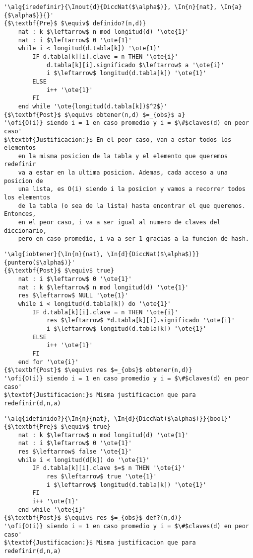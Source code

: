 \begin{lstlisting}[mathescape]
'\alg{iredefinir}{\Inout{d}{DiccNat($\alpha$)}, \In{n}{nat}, \In{a}{$\alpha$}}{}'
{$\textbf{Pre}$ $\equiv$ definido?(n,d)}
	nat : k $\leftarrow$ n mod longitud(d) '\ote{1}'
	nat : i $\leftarrow$ 0 '\ote{1}'
	while i < longitud(d.tabla[k]) '\ote{1}'
		IF d.tabla[k][i].clave = n THEN '\ote{i}'
			d.tabla[k][i].significado $\leftarrow$ a '\ote{i}'
			i $\leftarrow$ longitud(d.tabla[k]) '\ote{1}'
		ELSE
			i++ '\ote{1}'
		FI
	end while '\ote{longitud(d.tabla[k])$^2$}'
{$\textbf{Post}$ $\equiv$ obtener(n,d) $=_{obs}$ a}
'\ofi{O(i)} siendo i = 1 en caso promedio y i = $\#$claves(d) en peor caso'
$\textbf{Justificacion:}$ En el peor caso, van a estar todos los elementos
	en la misma posicion de la tabla y el elemento que queremos redefinir
	va a estar en la ultima posicion. Ademas, cada acceso a una posicion de
	una lista, es O(i) siendo i la posicion y vamos a recorrer todos los elementos
	de la tabla (o sea de la lista) hasta encontrar el que queremos. Entonces,
	en el peor caso, i va a ser igual al numero de claves del diccionario,
	pero en caso promedio, i va a ser 1 gracias a la funcion de hash.
\end{lstlisting}

\begin{lstlisting}[mathescape]
'\alg{iobtener}{\In{n}{nat}, \In{d}{DiccNat($\alpha$)}}{puntero($\alpha$)}'
{$\textbf{Post}$ $\equiv$ true}
	nat : i $\leftarrow$ 0 '\ote{1}'
	nat : k $\leftarrow$ n mod longitud(d) '\ote{1}'
	res $\leftarrow$ NULL '\ote{1}'
	while i < longitud(d.tabla[k]) do '\ote{1}'
		IF d.tabla[k][i].clave = n THEN '\ote{i}'
			res $\leftarrow$ *d.tabla[k][i].significado '\ote{i}'
			i $\leftarrow$ longitud(d.tabla[k]) '\ote{1}'
		ELSE
			i++ '\ote{1}'
		FI
	end for '\ote{i}'
{$\textbf{Post}$ $\equiv$ res $=_{obs}$ obtener(n,d)}
'\ofi{O(i)} siendo i = 1 en caso promedio y i = $\#$claves(d) en peor caso'
$\textbf{Justificacion:}$ Misma justificacion que para redefinir(d,n,a)
\end{lstlisting}

\begin{lstlisting}[mathescape]
'\alg{idefinido?}{\In{n}{nat}, \In{d}{DiccNat($\alpha$)}}{bool}'
{$\textbf{Pre}$ $\equiv$ true}
	nat : k $\leftarrow$ n mod longitud(d) '\ote{1}'
	nat : i $\leftarrow$ 0 '\ote{1}'
	res $\leftarrow$ false '\ote{1}'
	while i < longitud(d[k]) do '\ote{1}'
		IF d.tabla[k][i].clave $=$ n THEN '\ote{i}'
			res $\leftarrow$ true '\ote{1}'
			i $\leftarrow$ longitud(d.tabla[k]) '\ote{1}'
		FI
		i++ '\ote{1}'
	end while '\ote{i}'
{$\textbf{Post}$ $\equiv$ res $=_{obs}$ def?(n,d)}
'\ofi{O(i)} siendo i = 1 en caso promedio y i = $\#$claves(d) en peor caso'
$\textbf{Justificacion:}$ Misma justificacion que para redefinir(d,n,a)
\end{lstlisting}

